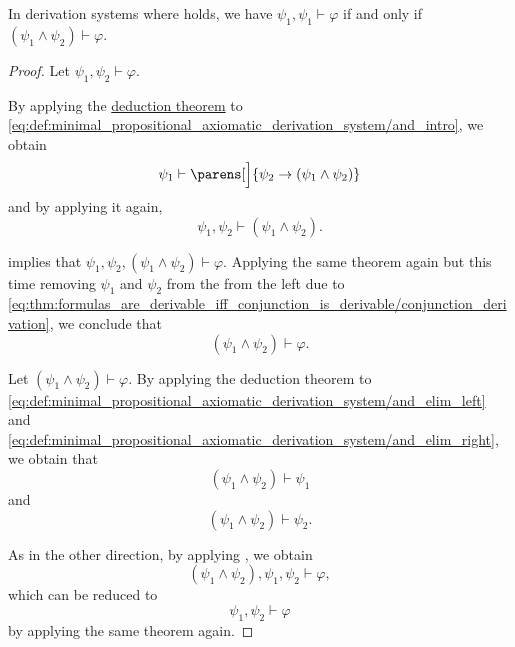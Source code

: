 \begin{proposition}\label{thm:formulas_are_derivable_iff_conjunction_is_derivable}
  In derivation systems where  holds, we have \( \psi_1, \psi_1 \vdash \varphi \) if and only if \( (\psi_1 \wedge \psi_2) \vdash \varphi \).
\end{proposition}
\begin{proof}
  \SufficiencySubProof Let \( \psi_1, \psi_2 \vdash \varphi \).

  By applying the \hyperref[thm:syntactic_deduction_theorem]{deduction theorem} to \eqref{eq:def:minimal_propositional_axiomatic_derivation_system/and_intro}, we obtain
  \begin{equation*}
    \psi_1 \vdash \parens[\Big]{ \psi_2 \rightarrow (\psi_1 \wedge \psi_2) }
  \end{equation*}
  and by applying it again,
  \begin{equation}\label{eq:thm:formulas_are_derivable_iff_conjunction_is_derivable/conjunction_derivation}
    \psi_1, \psi_2 \vdash (\psi_1 \wedge \psi_2).
  \end{equation}

   implies that \( \psi_1, \psi_2, (\psi_1 \wedge \psi_2) \vdash \varphi \). Applying the same theorem again but this time removing \( \psi_1 \) and \( \psi_2 \) from the from the left due to \eqref{eq:thm:formulas_are_derivable_iff_conjunction_is_derivable/conjunction_derivation}, we conclude that
  \begin{equation*}
    (\psi_1 \wedge \psi_2) \vdash \varphi.
  \end{equation*}

  \NecessitySubProof Let \( (\psi_1 \wedge \psi_2) \vdash \varphi \). By applying the deduction theorem to \eqref{eq:def:minimal_propositional_axiomatic_derivation_system/and_elim_left} and \eqref{eq:def:minimal_propositional_axiomatic_derivation_system/and_elim_right}, we obtain that
  \begin{equation*}
    (\psi_1 \wedge \psi_2) \vdash \psi_1
  \end{equation*}
  and
  \begin{equation*}
    (\psi_1 \wedge \psi_2) \vdash \psi_2.
  \end{equation*}

  As in the other direction, by applying , we obtain
  \begin{equation*}
    (\psi_1 \wedge \psi_2), \psi_1, \psi_2 \vdash \varphi,
  \end{equation*}
  which can be reduced to
  \begin{equation*}
    \psi_1, \psi_2 \vdash \varphi
  \end{equation*}
  by applying the same theorem again.
\end{proof}
